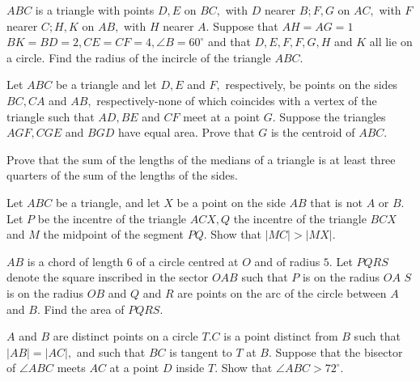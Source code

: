 \documentclass{pset}
\begin{document}
\begin{problems}
\begin{problem}[IrMO 2006 Q7]
    \(A B C\) is a triangle with points \(D, E\) on \(B C,\) with \(D\) nearer \(B ; F, G\) on \(A C,\) with \(F\) nearer \(C ; H, K\) on \(A B,\) with \(H\) nearer \(A .\) Suppose that \(A H=A G=1\) \(B K=B D=2, C E=C F=4, \angle B=60^{\circ}\) and that \(D, E, F, F, G, H\) and \(K\) all lie on a circle. Find the radius of the incircle of the triangle \(A B C .\)
\end{problem}

\begin{problem}[IrMO 2005 Q2]
    Let \(A B C\) be a triangle and let \(D, E\) and \(F,\) respectively, be points on the sides
    \(B C, C A\) and \(A B,\) respectively-none of which coincides with a vertex of the triangle such that \(A D, B E\) and \(C F\) meet at a point \(G .\) Suppose the triangles \(A G F, C G E\) and \(B G D\) have equal area. Prove that \(G\) is the centroid of \(A B C\).
\end{problem}

\begin{problem}[IrMO 2005 Q3]
    Prove that the sum of the lengths of the medians of a triangle is at least three quarters of the sum of the lengths of the sides.
\end{problem}

\begin{problem}[IrMO 2005 Q6]
    Let \(A B C\) be a triangle, and let \(X\) be a point on the side \(A B\) that is not \(A\) or \(B .\) Let \(P\) be the incentre of the triangle \(A C X, Q\) the incentre of the triangle \(B C X\) and \(M\) the midpoint of the segment \(P Q .\) Show that \(|M C|>|M X| .\)
\end{problem}

\begin{problem}[IrMO 2004 Q3]
    \(A B\) is a chord of length 6 of a circle centred at \(O\) and of radius \(5 .\) Let \(P Q R S\) denote the square inscribed in the sector \(O A B\) such that \(P\) is on the radius \(O A\) \(S\) is on the radius \(O B\) and \(Q\) and \(R\) are points on the arc of the circle between \(A\) and \(B .\) Find the area of \(P Q R S\).
\end{problem}

\begin{problem}[IrMO 2004 Q2]
    \(A\) and \(B\) are distinct points on a circle \(T . C\) is a point distinct from \(B\) such that \(|A B|=|A C|,\) and such that \(B C\) is tangent to \(T\) at \(B .\) Suppose that the bisector
    of \(\angle A B C\) meets \(A C\) at a point \(D\) inside \(T .\) Show that \(\angle A B C>72^{\circ} .\)
\end{problem}


\end{problems}
\end{document}
